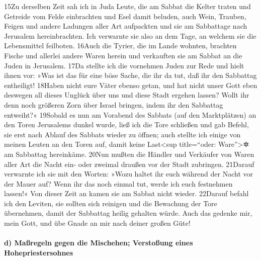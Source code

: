 15Zu derselben Zeit sah ich in Juda Leute, die am Sabbat die Kelter
traten und Getreide vom Felde einbrachten und Esel damit beluden, auch
Wein, Trauben, Feigen und andere Ladungen aller Art aufpackten und sie
am Sabbattage nach Jerusalem hereinbrachten. Ich verwarnte sie also an
dem Tage, an welchem sie die Lebensmittel feilboten. 16Auch die Tyrier,
die im Lande wohnten, brachten Fische und allerlei andere Waren herein
und verkauften sie am Sabbat an die Juden in Jerusalem. 17Da stellte ich
die vornehmen Juden zur Rede und hielt ihnen vor: »Was ist das für eine
böse Sache, die ihr da tut, daß ihr den Sabbattag entheiligt! 18Haben
nicht eure Väter ebenso getan, und hat nicht unser Gott eben deswegen
all dieses Unglück über uns und diese Stadt ergehen lassen? Wollt ihr
denn noch größeren Zorn über Israel bringen, indem ihr den Sabbattag
entweiht?« 19Sobald es nun am Vorabend des Sabbats (auf den
Marktplätzen) an den Toren Jerusalems dunkel wurde, ließ ich die Tore
schließen und gab Befehl, sie erst nach Ablauf des Sabbats wieder zu
öffnen; auch stellte ich einige von meinen Leuten an den Toren auf,
damit keine Last\textless sup title=``oder: Ware''\textgreater✲ am
Sabbattag hereinkäme. 20Nun mußten die Händler und Verkäufer von Waren
aller Art die Nacht ein- oder zweimal draußen vor der Stadt zubringen.
21Darauf verwarnte ich sie mit den Worten: »Wozu haltet ihr euch während
der Nacht vor der Mauer auf? Wenn ihr das noch einmal tut, werde ich
euch festnehmen lassen!« Von dieser Zeit an kamen sie am Sabbat nicht
wieder. 22Darauf befahl ich den Leviten, sie sollten sich reinigen und
die Bewachung der Tore übernehmen, damit der Sabbattag heilig gehalten
würde. Auch das gedenke mir, mein Gott, und übe Gnade an mir nach deiner
großen Güte!

\hypertarget{d-mauxdfregeln-gegen-die-mischehen-verstouxdfung-eines-hohepriestersohnes}{%
\paragraph{d) Maßregeln gegen die Mischehen; Verstoßung eines
Hohepriestersohnes}\label{d-mauxdfregeln-gegen-die-mischehen-verstouxdfung-eines-hohepriestersohnes}}

